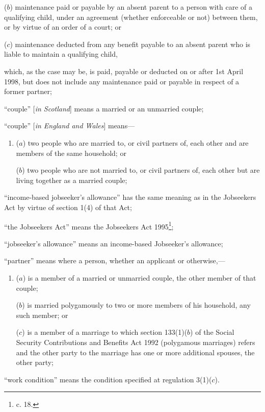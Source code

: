 \documentclass[12pt,a4paper]{article}
\begin{document}
\begin{enumerate}
\begin{enumerate}
    ($b$) 
    maintenance paid or payable by an absent parent to a person with care of a qualifying child, under an agreement (whether enforceable or not) between them, or by virtue of an order of a court; or

    ($c$) 
    maintenance deducted from any benefit payable to an absent parent who is liable to maintain a qualifying child,
\end{enumerate}
    which, as the case may be, is paid, payable or deducted on or after 1st April 1998, but does not include any maintenance paid or payable in respect of a former partner;

“couple” [\emph{in Scotland}] means a married or an unmarried couple;

“couple” [\emph{in England and Wales}] means—
\begin{enumerate}\item[]
($a$) 
two people who are married to, or civil partners of, each other and are members of the same household; or

($b$) 
two people who are not married to, or civil partners of, each other but are living together as a married couple;
\end{enumerate}

“income-based jobseeker’s allowance” has the same meaning as in the Jobseekers Act by virtue of section 1(4) of that Act;

“the Jobseekers Act” means the Jobseekers Act 1995\footnote{ c. 18.};

\begin{sloppypar}
“jobseeker’s allowance” means an income-based Jobseeker’s allowance;
\end{sloppypar}

“partner” means where a person, whether an applicant or otherwise,—
\begin{enumerate}\item[]
($a$) is a member of a married or unmarried couple, the other member of that couple;

($b$) is married polygamously to two or more members of his household, any such member; or

($c$) is a member of a marriage to which section 133(1)($b$) of the Social Security Contributions and Benefits Act 1992 (polygamous marriages) refers and the other party to the marriage has one or more additional spouses, the other party;
\end{enumerate}

“work condition” means the condition specified at regulation 3(1)($c$).
\end{enumerate}
\end{document}
